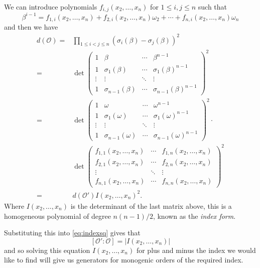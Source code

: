 \documentclass[12pt,a4paper,abstracton,bibtotoc]{scrreprt}
\theoremstyle{definition}
\renewcommand{\O}{\mathcal{O}}
\begin{document}
We can introduce polynomials $f_{i,j}(x_2,\ldots,x_n)$ for $1\le i,j\le n$ such that
\[
\beta^{i-1} = f_{1,i}(x_2,\ldots,x_n) + f_{2,i}(x_2,\ldots,x_n)\omega_2 + \cdots + f_{n,i}(x_2,\ldots,x_n)\omega_n
\]
and then we have
\begin{align*}
d(\O) =& \prod_{1\le i<j\le n} (\sigma_i(\beta) - \sigma_j(\beta))^2\\
=&\det\begin{pmatrix}
1 & \beta & \cdots & \beta^{n-1}\\
1 & \sigma_1(\beta) & \cdots & \sigma_1(\beta)^{n-1}\\
\vdots & \vdots & \ddots & \vdots\\
1 & \sigma_{n-1}(\beta) & \cdots & \sigma_{n-1}(\beta)^{n-1}
\end{pmatrix}^2\\
=&\det\begin{pmatrix}
1 & \omega & \cdots & \omega^{n-1}\\
1 & \sigma_1(\omega) & \cdots & \sigma_1(\omega)^{n-1}\\
\vdots & \vdots & \ddots & \vdots\\
1 & \sigma_{n-1}(\omega) & \cdots & \sigma_{n-1}(\omega)^{n-1}
\end{pmatrix}^2 \cdot\\
&\det\begin{pmatrix}
f_{1,1}(x_2,\ldots,x_n) & \cdots & f_{1,n}(x_2,\ldots,x_n)\\
f_{2,1}(x_2,\ldots,x_n)& \cdots & f_{2,n}(x_2,\ldots,x_n)\\
\vdots & \ddots & \vdots\\
f_{n,1}(x_2,\ldots,x_n) & \cdots & f_{n,n}(x_2,\ldots,x_n)
\end{pmatrix}^2\\
=& d(\O') I(x_2,\ldots,x_n)^2.
\end{align*}
Where $I(x_2,\ldots,x_n)$ is the determinant of the last matrix above, this is a homogeneous polynomial of degree $n(n-1)/2$, known as the \emph{index form}.

Substituting this into \ref{eq:indexsq} gives that
\[
[\O':\O] = |I(x_2,\ldots,x_n)|
\]
and so solving this equation $I(x_2,\ldots,x_n)$ for plus and minus the index we would like to find will give us generators for monogenic orders of the required index.
\end{document}
